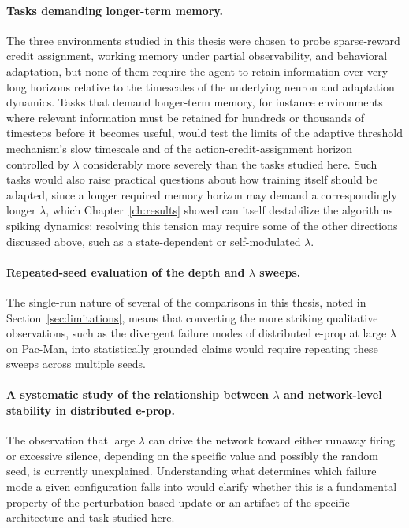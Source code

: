 \paragraph{Tasks demanding longer-term memory.} The three environments
studied in this thesis were chosen to probe sparse-reward credit
assignment, working memory under partial observability, and behavioral
adaptation, but none of them require the agent to retain information over
very long horizons relative to the timescales of the underlying neuron
and adaptation dynamics. Tasks that demand longer-term memory, for
instance environments where relevant information must be retained for
hundreds or thousands of timesteps before it becomes useful, would test
the limits of the adaptive threshold mechanism's slow timescale 
and of the action-credit-assignment
horizon controlled by $\lambda$ considerably more severely than the tasks
studied here. Such tasks would also raise practical questions about how
training itself should be adapted, since a longer required memory horizon
may demand a correspondingly longer $\lambda$, which Chapter~\ref{ch:results}
showed can itself destabilize the algorithms spiking dynamics;
resolving this tension may require some of the other directions
discussed above, such as a state-dependent or self-modulated $\lambda$.

\paragraph{Repeated-seed evaluation of the depth and $\lambda$ sweeps.} The
single-run nature of several of the comparisons in this thesis, noted in
Section~\ref{sec:limitations}, means that converting the more striking
qualitative observations, such as the divergent failure modes of
distributed e-prop at large $\lambda$ on Pac-Man, into statistically
grounded claims would require repeating these sweeps across multiple
seeds.

\paragraph{A systematic study of the relationship between $\lambda$ and
network-level stability in distributed e-prop.} The observation that
large $\lambda$ can drive the network toward either runaway firing or
excessive silence, depending on the specific value and possibly the
random seed, is currently unexplained. Understanding what determines
which failure mode a given configuration falls into would clarify
whether this is a fundamental property of the perturbation-based update
or an artifact of the specific architecture and task studied here.

